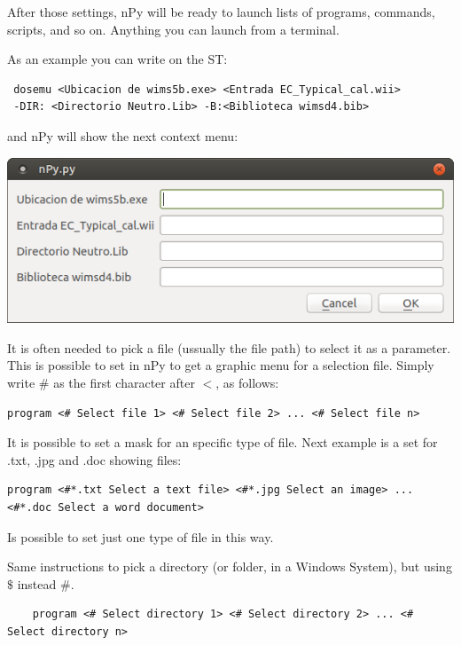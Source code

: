 \documentclass[a4paper,10pt]{article}
\begin{document}
\bigskip 

After those settings, nPy will be ready to launch lists of programs, commands, scripts, and so on. Anything you can launch from a terminal.

\bigskip 

\noindent As an example you can write on the ST:
\begin{verbatim}
 dosemu <Ubicacion de wims5b.exe> <Entrada EC_Typical_cal.wii> 
 -DIR: <Directorio Neutro.Lib> -B:<Biblioteca wimsd4.bib>
 \end{verbatim}
 
 \noindent and nPy will show the next context menu:
\begin{center}
 \includegraphics[width=\textwidth]{img/contextMenuString.png}
\end{center}

\bigskip 

It is often needed to pick a file (ussually the file path) to select it as a parameter. This is possible to set in nPy to get a graphic menu for a selection file. Simply write $\#$ as the first character after $<$, as follows: 

\begin{verbatim}
program <# Select file 1> <# Select file 2> ... <# Select file n>
 \end{verbatim}

It is possible to set a mask for an specific type of file. Next example is a set for .txt, .jpg and .doc showing files:

\begin{verbatim}
program <#*.txt Select a text file> <#*.jpg Select an image> ... <#*.doc Select a word document>
 \end{verbatim}

Is possible to set just one type of file in this way.

Same instructions to pick a directory (or folder, in a Windows System), but using $\$$ instead $\#$.

 \begin{verbatim}
    program <# Select directory 1> <# Select directory 2> ... <# Select directory n>
\end{verbatim}
\end{document}
